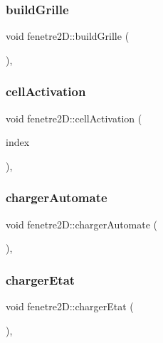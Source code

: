 \subsubsection{\texorpdfstring{build\+Grille}{buildGrille}}
{\footnotesize\ttfamily void fenetre2\+D\+::build\+Grille (\begin{DoxyParamCaption}{ }\end{DoxyParamCaption})\hspace{0.3cm}{\ttfamily [private]}, {\ttfamily [slot]}}

\mbox{\label{classfenetre2_d_abb32f8f446b8e4fd1b0d0dc35cf9286e}} 
\subsubsection{\texorpdfstring{cell\+Activation}{cellActivation}}
{\footnotesize\ttfamily void fenetre2\+D\+::cell\+Activation (\begin{DoxyParamCaption}\item[{const Q\+Model\+Index \&}]{index }\end{DoxyParamCaption})\hspace{0.3cm}{\ttfamily [private]}, {\ttfamily [slot]}}

\mbox{\label{classfenetre2_d_a01cea5868b15fc22c037902189f909c2}} 
\subsubsection{\texorpdfstring{charger\+Automate}{chargerAutomate}}
{\footnotesize\ttfamily void fenetre2\+D\+::charger\+Automate (\begin{DoxyParamCaption}{ }\end{DoxyParamCaption})\hspace{0.3cm}{\ttfamily [private]}, {\ttfamily [slot]}}

\mbox{\label{classfenetre2_d_ac300cc61b3bcec7a09e254c7aba0600e}} 
\subsubsection{\texorpdfstring{charger\+Etat}{chargerEtat}}
{\footnotesize\ttfamily void fenetre2\+D\+::charger\+Etat (\begin{DoxyParamCaption}{ }\end{DoxyParamCaption})\hspace{0.3cm}{\ttfamily [private]}, {\ttfamily [slot]}}

